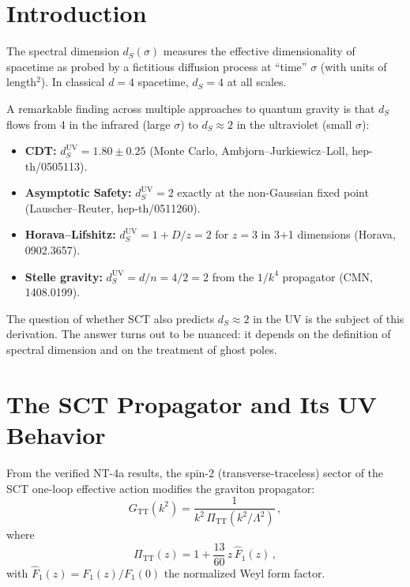 \documentclass[11pt,a4paper]{article}
\newcommand{\PiTT}{\Pi_{\mathrm{TT}}}
\newcommand{\Fhat}{\hat{F}}
\newcommand{\ds}{d_S}
\begin{document}
\tableofcontents

\section{Introduction}
\label{sec:intro}

The spectral dimension $\ds(\sigma)$ measures the effective dimensionality
of spacetime as probed by a fictitious diffusion process at ``time''
$\sigma$ (with units of length$^2$). In classical $d=4$ spacetime,
$\ds = 4$ at all scales.

A remarkable finding across multiple approaches to quantum gravity is that
$\ds$ flows from 4 in the infrared (large $\sigma$) to $\ds \approx 2$ in
the ultraviolet (small $\sigma$):
\begin{itemize}[nosep]
  \item \textbf{CDT:} $\ds^{\mathrm{UV}} = 1.80 \pm 0.25$ (Monte Carlo,
    Ambjorn--Jurkiewicz--Loll, hep-th/0505113).
  \item \textbf{Asymptotic Safety:} $\ds^{\mathrm{UV}} = 2$ exactly at the
    non-Gaussian fixed point (Lauscher--Reuter, hep-th/0511260).
  \item \textbf{Horava--Lifshitz:} $\ds^{\mathrm{UV}} = 1 + D/z = 2$
    for $z=3$ in 3+1 dimensions (Horava, 0902.3657).
  \item \textbf{Stelle gravity:} $\ds^{\mathrm{UV}} = d/n = 4/2 = 2$
    from the $1/k^4$ propagator (CMN, 1408.0199).
\end{itemize}

The question of whether SCT also predicts $\ds \approx 2$ in the UV is the
subject of this derivation. The answer turns out to be nuanced: it depends
on the definition of spectral dimension and on the treatment of ghost poles.


\section{The SCT Propagator and Its UV Behavior}
\label{sec:propagator}

From the verified NT-4a results, the spin-2 (transverse-traceless) sector
of the SCT one-loop effective action modifies the graviton propagator:
\begin{equation}\label{eq:GTT}
  G_{\mathrm{TT}}(k^2) = \frac{1}{k^2\,\PiTT(k^2/\Lambda^2)}\,,
\end{equation}
where
\begin{equation}\label{eq:PiTT}
  \PiTT(z) = 1 + \frac{13}{60}\,z\,\Fhat_1(z)\,,
\end{equation}
with $\Fhat_1(z) = F_1(z)/F_1(0)$ the normalized Weyl form factor.
\end{document}
